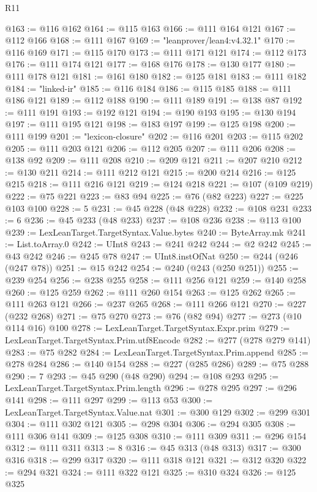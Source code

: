 \begin{lexlean}{R11}
\begin{coremodule}
@163 := @116 @162
@164 := @115 @163
@166 := @111 @164 @121
@167 := @112 @166
@168 := @111 @167
@169 := "leanprover/lean4:v4.32.1"
@170 := @116 @169
@171 := @115 @170
@173 := @111 @171 @121
@174 := @112 @173
@176 := @111 @174 @121
@177 := @168 @176
@178 := @130 @177
@180 := @111 @178 @121
@181 := @161 @180
@182 := @125 @181
@183 := @111 @182
@184 := "linked-ir"
@185 := @116 @184
@186 := @115 @185
@188 := @111 @186 @121
@189 := @112 @188
@190 := @111 @189
@191 := @138 @87
@192 := @111 @191
@193 := @192 @121
@194 := @190 @193
@195 := @130 @194
@197 := @111 @195 @121
@198 := @183 @197
@199 := @125 @198
@200 := @111 @199
@201 := "lexicon-closure"
@202 := @116 @201
@203 := @115 @202
@205 := @111 @203 @121
@206 := @112 @205
@207 := @111 @206
@208 := @138 @92
@209 := @111 @208
@210 := @209 @121
@211 := @207 @210
@212 := @130 @211
@214 := @111 @212 @121
@215 := @200 @214
@216 := @125 @215
@218 := @111 @216 @121
@219 := @124 @218
@221 := @107 (@109 @219)
@222 := @75 @221
@223 := @83 @94
@225 := @76 (@82 @223)
@227 := @225 @103 @100
@228 := 5
@231 := @45 @228 (@48 @228)
@232 := @108 @231
@233 := 6
@236 := @45 @233 (@48 @233)
@237 := @108 @236
@238 := @113 @100
@239 := LexLeanTarget.TargetSyntax.Value.bytes
@240 := ByteArray.mk
@241 := List.toArray.{0}
@242 := UInt8
@243 := @241 @242
@244 := @2 @242
@245 := @43 @242
@246 := @245 @78
@247 := UInt8.instOfNat
@250 := @244 (@246 (@247 @78))
@251 := @15 @242
@254 := @240 (@243 (@250 @251))
@255 := @239 @254
@256 := @238 @255
@258 := @111 @256 @121
@259 := @140 @258
@260 := @125 @259
@262 := @111 @260 @154
@263 := @125 @262
@265 := @111 @263 @121
@266 := @237 @265
@268 := @111 @266 @121
@270 := @227 (@232 @268)
@271 := @75 @270
@273 := @76 (@82 @94)
@277 := @273 (@10 @114 @16) @100
@278 := LexLeanTarget.TargetSyntax.Expr.prim
@279 := LexLeanTarget.TargetSyntax.Prim.utf8Encode
@282 := @277 (@278 @279 @141)
@283 := @75 @282
@284 := LexLeanTarget.TargetSyntax.Prim.append
@285 := @278 @284
@286 := @140 @154
@288 := @227 (@285 @286)
@289 := @75 @288
@290 := 7
@293 := @45 @290 (@48 @290)
@294 := @108 @293
@295 := LexLeanTarget.TargetSyntax.Prim.length
@296 := @278 @295
@297 := @296 @141
@298 := @111 @297
@299 := @113 @53
@300 := LexLeanTarget.TargetSyntax.Value.nat
@301 := @300 @129
@302 := @299 @301
@304 := @111 @302 @121
@305 := @298 @304
@306 := @294 @305
@308 := @111 @306 @141
@309 := @125 @308
@310 := @111 @309
@311 := @296 @154
@312 := @111 @311
@313 := 8
@316 := @45 @313 (@48 @313)
@317 := @300 @316
@318 := @299 @317
@320 := @111 @318 @121
@321 := @312 @320
@322 := @294 @321
@324 := @111 @322 @121
@325 := @310 @324
@326 := @125 @325

\end{coremodule}
\end{lexlean}

